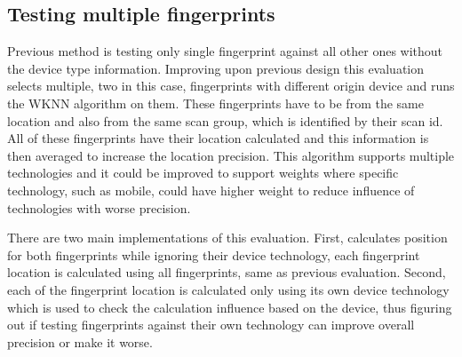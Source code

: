 \subsection{Testing multiple fingerprints}\label{sec:TestingMultipleFingerprint}
Previous method is testing only single fingerprint against all other ones without the device type information. Improving upon previous design this evaluation selects multiple, two in this case, fingerprints with different origin device and runs the WKNN algorithm on them. These fingerprints have to be from the same location and also from the same scan group, which is identified by their scan id. All of these fingerprints have their location calculated and this information is then averaged to increase the location precision. This algorithm supports multiple technologies and it could be improved to support weights where specific technology, such as mobile, could have higher weight to reduce influence of technologies with worse precision.

There are two main implementations of this evaluation. First, calculates position for both fingerprints while ignoring  their device technology, each fingerprint location is calculated using all fingerprints, same as previous evaluation. Second, each of the fingerprint location is calculated only using its own device technology which is used to check the calculation influence based on the device, thus figuring out if testing fingerprints against their own technology can improve overall precision or make it worse.

\begin{table}[h]
	\begin{center}
		\caption{List of errors for testing multiple fingerprints}
		\label{tab06c06}
	\end{center}
\end{table}

